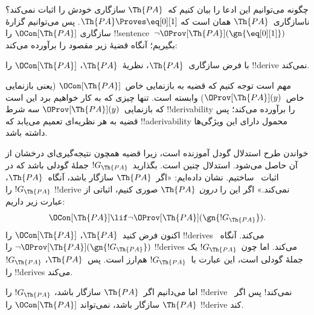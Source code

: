 \documentclass[../../../include/open-logic-section]{subfiles}
\begin{document}


چگونه می‌توانیم این ادعا را بیان کنیم که~$\Th{PA}$ سازگاری خودش را
اثبات نمی‌کند؟ ناسازگاری~$\Th{PA}$ همان است که
$\Th{PA} \Proves \eq[0][1]$. پس می‌توانیم گزارهٔ سازگاری
$\OCon[\Th{PA}]$ را !!{sentence}~$\lnot
\OProv[\Th{PA}](\gn{\eq[0][1]})$ بگیریم؛ آنگاه قضیهٔ زیر مقصود را
برآورده می‌کند:

\begin{thm}
با فرض سازگاری~$\Th{PA}$، نظریهٔ~$\Th{PA}$، $\OCon[\Th{PA}]$ را
!!{derive} نمی‌کند.
\end{thm}

مهم است توجه کنیم که قضیه به بازنمایی خاص~$\OCon[\Th{PA}]$ (یعنی
بازنمایی خاص~$\OProv[\Th{PA}](y)$) وابسته است. تنها چیزی که به کار
خواهیم برد این است که بازنمایی~$\OProv[\Th{PA}](y)$ سه شرط
!!{derivability} را برآورده می‌کند؛ پس قضیه به هر نظریه‌ای تعمیم می‌یابد
که !!a{derivability} محمول دارای این ویژگی‌ها داشته باشد.

خواندن طرح استدلال گودل آموزنده است، زیرا قضیه همچون نتیجه‌گیری‌ای
درخشان از آن حاصل می‌شود. استدلال چنین است. بگذارید~$!G_\Th{PA}$ جملهٔ
گودلی باشد که در اثبات~ ساختیم.
نشان داده‌ایم: «اگر~$\Th{PA}$ سازگار باشد، آنگاه~$\Th{PA}$،
$!G_\Th{PA}$ را !!{derive} نمی‌کند.» اگر این را \emph{درون}
$\Th{PA}$ صوری کنیم، اثباتی از عبارت زیر داریم:
\[
\OCon[\Th{PA}] \lif \lnot \OProv[\Th{PA}](\gn{!G_\Th{PA}}).
\]
اکنون فرض کنید~$\Th{PA}$، $\OCon[\Th{PA}]$ را !!{derive}s می‌کند.
آنگاه~$\lnot \OProv[\Th{PA}](\gn{!G_\Th{PA}})$ را !!{derive}s می‌کند.
اما چون~$!G_\Th{PA}$ یک جملهٔ گودلی است، این عبارت با~$!G_\Th{PA}$
هم‌ارز است. پس~$\Th{PA}$، $!G_\Th{PA}$ را !!{derive}s می‌کند.

اما می‌دانیم اگر~$\Th{PA}$ سازگار باشد، $!G_\Th{PA}$ را !!{derive}
نمی‌کند!{} پس اگر~$\Th{PA}$ سازگار باشد، نمی‌تواند
$\OCon[\Th{PA}]$ را !!{derive} کند.
\end{document}
